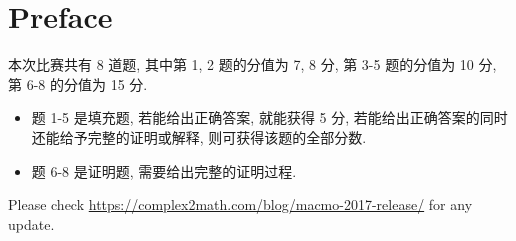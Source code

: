 \documentclass[10pt]{article}
\begin{document}


{}
\section*{Preface}

本次比赛共有 8 道题, 其中第 1, 2 题的分值为 7, 8 分,
第 3-5 题的分值为 10 分, 第 6-8 的分值为 15 分.

\begin{itemize}
\item 题 1-5 是填充题, 若能给出正确答案, 就能获得 5 分,
若能给出正确答案的同时还能给予完整的证明或解释, 则可获得该题的全部分数.
\item 题 6-8 是证明题, 需要给出完整的证明过程.
\end{itemize}

Please check \url{https://complex2math.com/blog/macmo-2017-release/} for any update.

\newpage
















\end{document}
